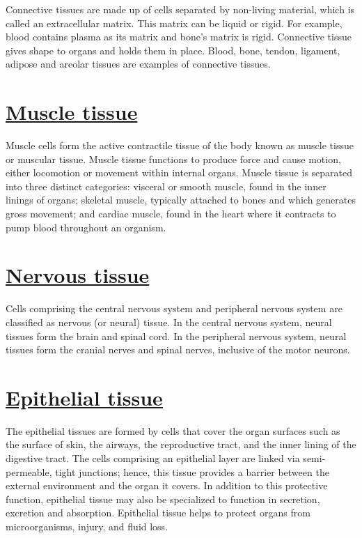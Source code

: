 Connective tissues are made up of cells separated by non-living
material, which is called an extracellular matrix. This matrix can be
liquid or rigid. For example, blood contains plasma as its matrix and
bone's matrix is rigid. Connective tissue gives shape to organs and
holds them in place. Blood, bone, tendon, ligament, adipose and areolar
tissues are examples of connective tissues.

\section{\texorpdfstring{\href{https://en.wikipedia.org/wiki/Muscle_tissue}{Muscle
tissue}}{Muscle tissue}}\label{muscle-tissue}

Muscle cells form the active contractile tissue of the body known as
muscle tissue or muscular tissue. Muscle tissue functions to produce
force and cause motion, either locomotion or movement within internal
organs. Muscle tissue is separated into three distinct categories:
visceral or smooth muscle, found in the inner linings of organs;
skeletal muscle, typically attached to bones and which generates gross
movement; and cardiac muscle, found in the heart where it contracts to
pump blood throughout an organism.

\section{\texorpdfstring{\href{https://en.wikipedia.org/wiki/Nervous_tissue}{Nervous
tissue}}{Nervous tissue}}\label{nervous-tissue}

Cells comprising the central nervous system and peripheral nervous
system are classified as nervous (or neural) tissue. In the central
nervous system, neural tissues form the brain and spinal cord. In the
peripheral nervous system, neural tissues form the cranial nerves and
spinal nerves, inclusive of the motor neurons.

\section{\texorpdfstring{\href{https://en.wikipedia.org/wiki/Epithelium}{Epithelial
tissue}}{Epithelial tissue}}\label{epithelial-tissue}

The epithelial tissues are formed by cells that cover the organ surfaces
such as the surface of skin, the airways, the reproductive tract, and
the inner lining of the digestive tract. The cells comprising an
epithelial layer are linked via semi-permeable, tight junctions; hence,
this tissue provides a barrier between the external environment and the
organ it covers. In addition to this protective function, epithelial
tissue may also be specialized to function in secretion, excretion and
absorption. Epithelial tissue helps to protect organs from
microorganisms, injury, and fluid loss.

